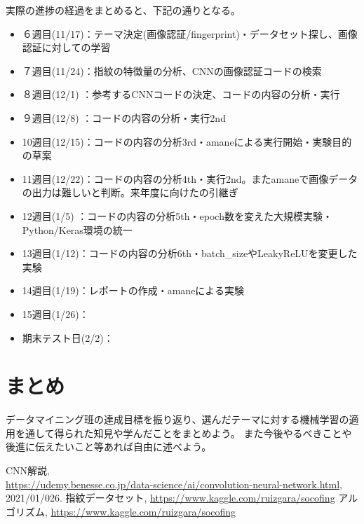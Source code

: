 \documentclass[a4paper, 11pt, titlepage]{jsarticle}
\begin{document}
実際の進捗の経過をまとめると、下記の通りとなる。
\begin{itemize}
\item	６週目(11/17)：テーマ決定(画像認証/fingerprint)・データセット探し、画像認証に対しての学習
\item	７週目(11/24)：指紋の特徴量の分析、CNNの画像認証コードの検索
\item	８週目(12/1)  ：参考するCNNコードの決定、コードの内容の分析・実行%
\item	９週目(12/8)  ：コードの内容の分析・実行2nd
\item	10週目(12/15)：コードの内容の分析3rd・amaneによる実行開始・実験目的の草案
\item	11週目(12/22)：コードの内容の分析4th・実行2nd。またamaneで画像データの出力は難しいと判断。来年度に向けたの引継ぎ
\item	12週目(1/5)  ：コードの内容の分析5th・epoch数を変えた大規模実験・Python/Keras環境の統一
\item	13週目(1/12)：コードの内容の分析6th・batch\_sizeやLeakyReLUを変更した実験
\item	14週目(1/19)：レポートの作成・amaneによる実験
\item	15週目(1/26)：
\item	期末テスト日(2/2)：
\end{itemize}



\section{まとめ}
データマイニング班の達成目標を振り返り、選んだテーマに対する機械学習の適用を通して得られた知見や学んだことをまとめよう。
また今後やるべきことや後進に伝えたいこと等あれば自由に述べよう。

\begin{thebibliography}{n}
   CNN解説, \\
  \url{https://udemy.benesse.co.jp/data-science/ai/convolution-neural-network.html}, 2021/01/026.
  指紋データセット, 
  \url{https://www.kaggle.com/ruizgara/socofing}
  アルゴリズム, \url{https://www.kaggle.com/ruizgara/socofing}
  \bibitem{}
\end{thebibliography}
\end{document}
